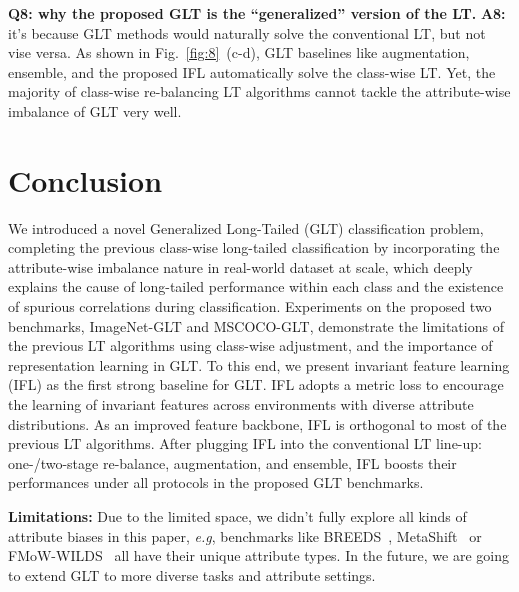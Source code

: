 \documentclass{article}
\def\eg{\emph{e.g}} \def\Eg{\emph{E.g}}
\begin{document}
\noindent\textbf{Q8: why the proposed GLT is the ``generalized'' version of the LT.} \textbf{A8:} it's because GLT methods would naturally solve the conventional LT, but not vise versa. As shown in Fig.~\ref{fig:8}~(c-d), GLT baselines like augmentation, ensemble, and the proposed IFL automatically solve the class-wise LT. Yet, the majority of class-wise re-balancing LT algorithms cannot tackle the attribute-wise imbalance of GLT very well. 


















 
\section{Conclusion}
\label{sec:6}

We introduced a novel Generalized Long-Tailed (GLT) classification problem, completing the previous class-wise long-tailed classification by incorporating the attribute-wise imbalance nature in real-world dataset at scale, which deeply explains the cause of long-tailed performance within each class and the existence of spurious correlations during classification. Experiments on the proposed two benchmarks, ImageNet-GLT and MSCOCO-GLT, demonstrate the limitations of the previous LT algorithms using class-wise adjustment, and the importance of representation learning in GLT. To this end, we present invariant feature learning (IFL) as the first strong baseline for GLT. IFL adopts a metric loss to encourage the learning of invariant features across environments with diverse attribute distributions. As an improved feature backbone, IFL is orthogonal to most of the previous LT algorithms. After plugging IFL into the conventional LT line-up: one-/two-stage re-balance, augmentation, and ensemble, IFL boosts their performances under all protocols in the proposed GLT benchmarks. 

\noindent\textbf{Limitations: } Due to the limited space, we didn't fully explore all kinds of attribute biases in this paper, \eg, benchmarks like BREEDS~\cite{santurkar2020breeds}, MetaShift~\cite{liang2022metashift} or FMoW-WILDS~\cite{koh2021wilds} all have their unique attribute types. In the future, we are going to extend GLT to more diverse tasks and attribute settings.
\end{document}
